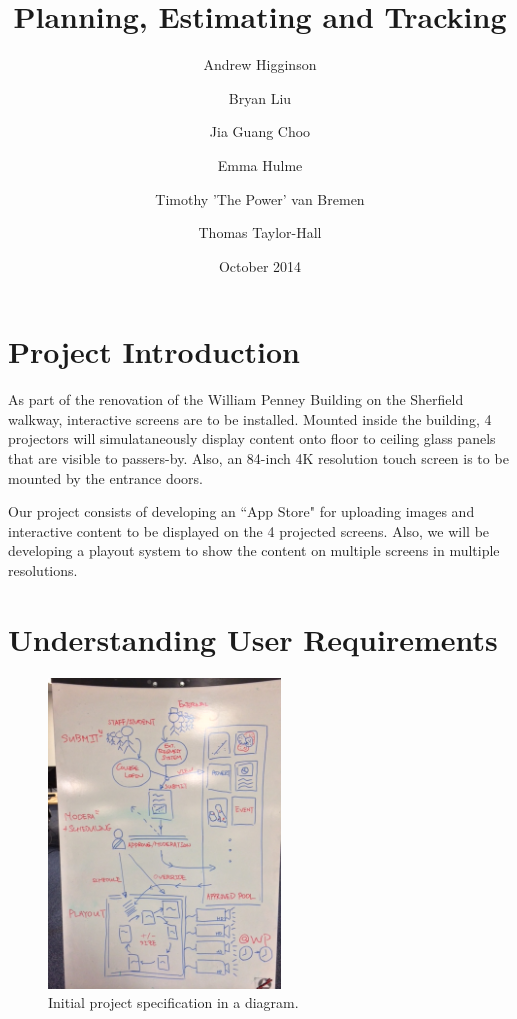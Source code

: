 \documentclass[a4paper]{article}
\begin{document}
\title{Planning, Estimating and Tracking}
\author{Andrew Higginson \and Bryan Liu \and Jia Guang Choo \and Emma Hulme \and 
Timothy 'The Power' van Bremen \and Thomas Taylor-Hall}
\date{October 2014}
\maketitle

\setcounter{table}{0}
\linespread{1.1}

\section{Project Introduction}
As part of the renovation of the William Penney Building on the Sherfield 
walkway, interactive screens are to be installed. Mounted inside the building, 4
projectors will simulataneously display content onto floor to ceiling glass
panels that are visible to passers-by. Also, an 84-inch 4K resolution touch 
screen is to be mounted by the entrance doors. 

Our project consists of developing an ``App Store" for uploading images and 
interactive content to be displayed on the 4 projected screens. Also, we will be
developing a playout system to show the content on multiple screens in multiple 
resolutions.



\section{Understanding User Requirements}

\begin{figure}[H]
  \centering
    \includegraphics[width = 0.55\textwidth, trim= 0 0.55cm 0 1.4cm, clip]{./planning/userreq.jpg}

  \caption{Initial project specification in a diagram.}
  \label{fig:userreq}
\end{figure}
\end{document}
